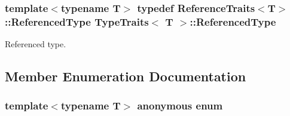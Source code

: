 \subsubsection[{\texorpdfstring{Referenced\+Type}{ReferencedType}}]{\setlength{\rightskip}{0pt plus 5cm}template$<$typename T$>$ typedef {\bf Reference\+Traits}$<$T$>$\+::{\bf Referenced\+Type} {\bf Type\+Traits}$<$ T $>$\+::{\bf Referenced\+Type}}\hypertarget{structTypeTraits_aad10ee3d301aeae33030c336748843b5}{}\label{structTypeTraits_aad10ee3d301aeae33030c336748843b5}
Referenced type. 

\subsection{Member Enumeration Documentation}
\subsubsection[{\texorpdfstring{anonymous enum}{anonymous enum}}]{\setlength{\rightskip}{0pt plus 5cm}template$<$typename T$>$ anonymous enum}\hypertarget{structTypeTraits_a7d00c130b9615e3afde257e7c3fd13f0}{}\label{structTypeTraits_a7d00c130b9615e3afde257e7c3fd13f0}
